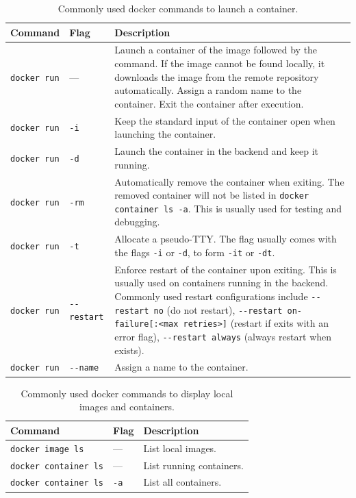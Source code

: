\begin{table}
	\centering \caption{Commonly used docker commands to launch a container.}\label{ch:vac:tab:launchcontainer}
	\begin{tabularx}{\textwidth}{llX}
		\hline
		Command & Flag & Description \\ \hline
		\verb|docker run| & --- & Launch a container of the image followed by the command. If the image cannot be found locally, it downloads the image from the remote repository automatically. Assign a random name to the container. Exit the container after execution. \\ \hdashline
        \verb|docker run| & \verb|-i| & Keep the standard input of the container open when launching the container. \\ \hdashline
        \verb|docker run| & \verb|-d| & Launch the container in the backend and keep it running. \\ \hdashline
        \verb|docker run| & \verb|-rm| & Automatically remove the container when exiting. The removed container will not be listed in \verb|docker container ls -a|. This is usually used for testing and debugging. \\ \hdashline
        \verb|docker run| & \verb|-t| & Allocate a pseudo-TTY. The flag usually comes with the flags \verb|-i| or \verb|-d|, to form \verb|-it| or \verb|-dt|. \\ \hdashline
        \verb|docker run| & \verb|--restart| & Enforce restart of the container upon exiting. This is usually used on containers running in the backend. Commonly used restart configurations include \verb|--restart no| (do not restart), \verb|--restart on-failure[:<max retries>]| (restart if exits with an error flag), \verb|--restart always| (always restart when exists). \\ \hdashline
        \verb|docker run| & \verb|--name| & Assign a name to the container. \\
		\hline
	\end{tabularx}
\end{table}

\begin{table}
	\centering \caption{Commonly used docker commands to display local images and containers.}\label{ch:vac:tab:listcontainer}
	\begin{tabularx}{\textwidth}{llX}
		\hline
		Command & Flag & Description \\ \hline
        \verb|docker image ls| & --- & List local images. \\ \hdashline
        \verb|docker container ls| & --- & List running containers. \\ \hdashline
        \verb|docker container ls| & \verb|-a| & List all containers. \\
		\hline
	\end{tabularx}
\end{table}


